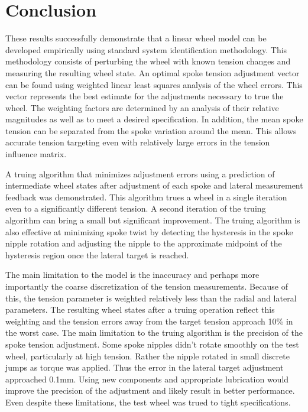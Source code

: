 \documentclass[journal]{IEEEtran}
\begin{document}




\section{Conclusion}
These results successfully demonstrate that a linear wheel model can be developed empirically using standard system identification methodology.  This methodology consists of perturbing the wheel with known tension changes and measuring the resulting wheel state.  An optimal spoke tension adjustment vector can be found using weighted linear least squares analysis of the wheel errors.  This vector represents the best estimate for the adjustments  necessary to true the wheel. The weighting factors are determined by an analysis of their relative magnitudes as well as to meet a desired specification. In addition, the mean spoke tension can be separated from the spoke variation around the mean.  This allows accurate tension targeting even with relatively large errors in the tension influence matrix.

A truing algorithm that minimizes adjustment errors using a prediction of intermediate wheel states after adjustment of each spoke and lateral measurement feedback was demonstrated. This algorithm trues a wheel in a single iteration even to a significantly different tension. A second iteration of the truing algorithm can bring a small but significant improvement. The truing algorithm is also effective at minimizing spoke twist by detecting the hysteresis in the spoke nipple rotation and adjusting the nipple to the approximate midpoint of the hysteresis region once the lateral target is reached. 

The main limitation to the model is the inaccuracy and perhaps more importantly the coarse discretization of the tension measurements.  Because of this, the tension parameter is weighted relatively less than the radial and lateral parameters.  The resulting wheel states after a truing operation reflect this weighting and the tension errors away from the target tension approach 10\% in the worst case. The main limitation to the truing algorithm is the precision of the spoke tension adjustment.  Some spoke nipples didn't rotate smoothly on the test wheel, particularly at high tension.  Rather the nipple rotated in small discrete jumps as torque was applied.  Thus the error in the lateral target adjustment approached 0.1mm.  Using new components and appropriate lubrication would improve the precision of the adjustment and likely result in better performance.  Even despite these limitations, the test wheel was trued to tight specifications.
\end{document}
